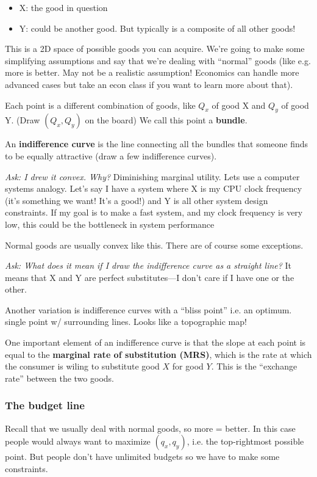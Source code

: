 \documentclass[11pt]{article}
\begin{document}
\begin{itemize}
    \item X: the good in question
    \item Y: could be another good. But typically is a composite of all other goods!
\end{itemize}

This is a 2D space of possible goods you can acquire. We're going to make some simplifying assumptions and say that we're dealing with ``normal'' goods (like e.g. more is better. May not be a realistic assumption! Economics can handle more advanced cases but take an econ class if you want to learn more about that).

Each point is a different combination of goods, like $Q_x$ of good X and $Q_y$ of good Y. (Draw $(Q_x, Q_y)$ on the board) We call this point a {\bf bundle}.

An {\bf indifference curve} is the line connecting all the bundles that someone finds to be equally attractive (draw a few indifference curves).

{\it Ask: I drew it convex. Why?} Diminishing marginal utility. Lets use a computer systems analogy. Let's say I have a system where X is my CPU clock frequency (it's something we want! It's a good!) and Y is all other system design constraints. If my goal is to make a fast system, and my clock frequency is very low, this could be the bottleneck in system performance

Normal goods are usually convex like this. There are of course some exceptions.

{\it Ask: What does it mean if I draw the indifference curve as a straight line?} It means that X and Y are perfect substitutes---I don't care if I have one or the other. 

Another variation is indifference curves with a ``bliss point'' i.e. an optimum. single point w/ surrounding lines. Looks like a topographic map!

One important element of an indifference curve is that the slope at each point is equal to the {\bf marginal rate of substitution (MRS)}, which is the rate at which the consumer is wiling to substitute good $X$ for good $Y$. This is the ``exchange rate'' between the two goods.

\subsubsection{The budget line}

Recall that we usually deal with normal goods, so more = better. In this case people would always want to maximize $(q_x, q_y)$, i.e. the top-rightmost possible point. But people don't have unlimited budgets so we have to make some constraints.
\end{document}
